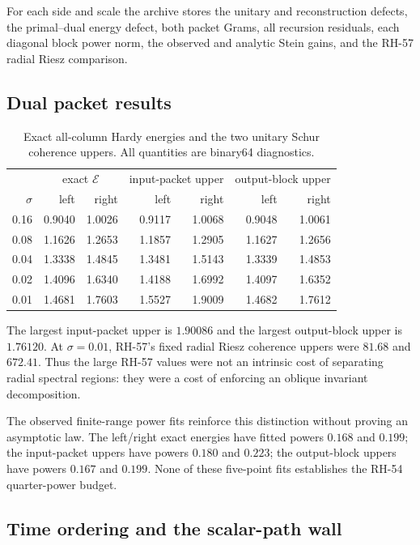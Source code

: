 \documentclass[11pt]{article}
\theoremstyle{remark}
\newcommand{\cE}{\mathcal E}
\begin{document}
For each side and scale the archive stores the unitary and reconstruction
defects, the primal--dual energy defect, both packet Grams, all recursion
residuals, each diagonal block power norm, the observed and analytic Stein
gains, and the RH-57 radial Riesz comparison.

\subsection{Dual packet results}

\begin{table}[H]
\centering
\small
\begin{tabular}{@{}r|rr|rr|rr@{}}
\toprule
 & \multicolumn{2}{c|}{exact $\cE$}
 & \multicolumn{2}{c|}{input-packet upper}
 & \multicolumn{2}{c}{output-block upper}\\
$\sigma$&left&right&left&right&left&right\\
\midrule
0.16&0.9040&1.0026&0.9117&1.0068&0.9048&1.0061\\
0.08&1.1626&1.2653&1.1857&1.2905&1.1627&1.2656\\
0.04&1.3338&1.4845&1.3481&1.5143&1.3339&1.4853\\
0.02&1.4096&1.6340&1.4188&1.6992&1.4097&1.6352\\
0.01&1.4681&1.7603&1.5527&1.9009&1.4682&1.7612\\
\bottomrule
\end{tabular}
\caption{Exact all-column Hardy energies and the two unitary Schur coherence
uppers.  All quantities are binary64 diagnostics.}
\label{tab:packets}
\end{table}

The largest input-packet upper is $1.90086$ and the largest output-block upper
is $1.76120$.  At $\sigma=0.01$, RH-57's fixed radial Riesz coherence uppers
were $81.68$ and $672.41$.  Thus the large RH-57 values were not an intrinsic
cost of separating radial spectral regions: they were a cost of enforcing an
oblique invariant decomposition.

The observed finite-range power fits reinforce this distinction without
proving an asymptotic law.  The left/right exact energies have fitted powers
$0.168$ and $0.199$; the input-packet uppers have powers $0.180$ and $0.223$;
the output-block uppers have powers $0.167$ and $0.199$.  None of these
five-point fits establishes the RH-54 quarter-power budget.

\subsection{Time ordering and the scalar-path wall}
\end{document}
